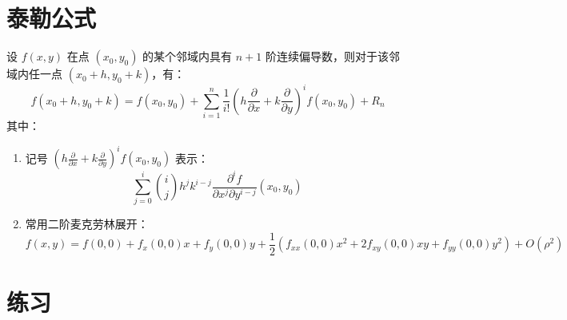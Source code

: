 \documentclass[12pt, a4paper, oneside, UTF8]{ctexbook}
\begin{document}
\section{泰勒公式}
\begin{theorem}[二元函数泰勒公式]
    设 $f(x,y)$ 在点 $(x_0, y_0)$ 的某个邻域内具有 $n+1$ 阶连续偏导数，则对于该邻域内任一点 $(x_0+h, y_0+k)$，有：
    \[ f(x_0+h, y_0+k) = f(x_0, y_0) + \sum_{i=1}^n \frac{1}{i!} \left( h\frac{\partial}{\partial x} + k\frac{\partial}{\partial y} \right)^i f(x_0, y_0) + R_n \]
    其中：
    \begin{enumerate}
        \item 记号 $\left( h\frac{\partial}{\partial x} + k\frac{\partial}{\partial y} \right)^i f(x_0, y_0)$ 表示：
        \[ \sum_{j=0}^i \binom{i}{j} h^j k^{i-j} \frac{\partial^i f}{\partial x^j \partial y^{i-j}}(x_0, y_0) \]
        \item 常用二阶麦克劳林展开：
        \[f(x,y)=f(0,0)+f_x(0,0)x+f_y(0,0)y+\frac{1}{2}\left(f_{xx}(0,0)x^2+2f_{xy}(0,0)xy+f_{yy}(0,0)y^2\right)+O(\rho^2)\]
    \end{enumerate}
\end{theorem}

\section{练习}
\end{document}
